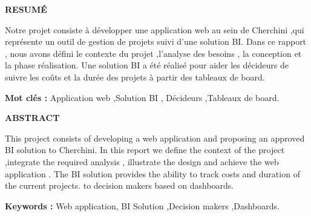 \newpage
\bigskip

\textbf{RESUM\'E}

\bigskip


Notre projet consiste \`{a} d\'{e}velopper une application web au sein de Cherchini
,qui repr\'{e}sente un outil de gestion de projets suivi d'une solution BI.
Dans ce rapport , nous avons d\'{e}fini le contexte du projet ,l'analyse des besoins ,
la conception  et la phase r\'{e}alisation. \newline
Une solution BI a \'{e}t\'{e} r\'{e}alis\'{e} pour aider les d\'{e}cideurs de suivre
les co\^{u}ts et la dur\'{e}e des projets \`{a} partir des tableaux de board.\newline

\textbf{Mot cl\'{e}s : } Application web ,Solution BI , D\'{e}cideurs ,Tableaux de board.


\bigskip
\bigskip
\bigskip

\textbf{ABSTRACT}


\bigskip


This project consists of developing a web application and proposing an approved BI solution to Cherchini.\newline
In this report we define the context of the project ,integrate the required analysis ,
illustrate the design and achieve the web application .\newline
The BI solution provides the ability to track costs and duration of the current projects.
to decision makers based on dashboards.\newline

\textbf{Keywords :}
Web application, BI Solution ,Decision makers ,Dashboards.